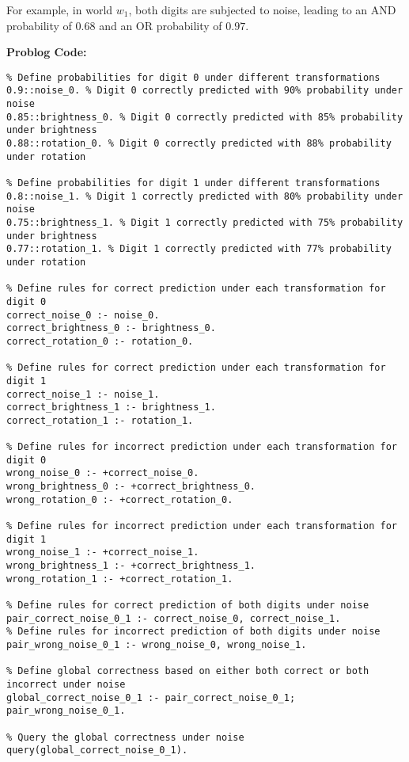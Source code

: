 For example, in world $w_1$, both digits are subjected to noise, leading to an AND probability of $0.68$ and an OR probability of $0.97$.

\textbf{Problog Code:}
\begin{mdframed}[leftline=false, rightline=false, topline=true, bottomline=true]
\scriptsize
\begin{verbatim}
% Define probabilities for digit 0 under different transformations
0.9::noise_0. % Digit 0 correctly predicted with 90% probability under noise
0.85::brightness_0. % Digit 0 correctly predicted with 85% probability under brightness
0.88::rotation_0. % Digit 0 correctly predicted with 88% probability under rotation

% Define probabilities for digit 1 under different transformations
0.8::noise_1. % Digit 1 correctly predicted with 80% probability under noise
0.75::brightness_1. % Digit 1 correctly predicted with 75% probability under brightness
0.77::rotation_1. % Digit 1 correctly predicted with 77% probability under rotation

% Define rules for correct prediction under each transformation for digit 0
correct_noise_0 :- noise_0.
correct_brightness_0 :- brightness_0.
correct_rotation_0 :- rotation_0.

% Define rules for correct prediction under each transformation for digit 1
correct_noise_1 :- noise_1.
correct_brightness_1 :- brightness_1.
correct_rotation_1 :- rotation_1.

% Define rules for incorrect prediction under each transformation for digit 0
wrong_noise_0 :- +correct_noise_0.
wrong_brightness_0 :- +correct_brightness_0.
wrong_rotation_0 :- +correct_rotation_0.

% Define rules for incorrect prediction under each transformation for digit 1
wrong_noise_1 :- +correct_noise_1.
wrong_brightness_1 :- +correct_brightness_1.
wrong_rotation_1 :- +correct_rotation_1.

% Define rules for correct prediction of both digits under noise
pair_correct_noise_0_1 :- correct_noise_0, correct_noise_1.
% Define rules for incorrect prediction of both digits under noise
pair_wrong_noise_0_1 :- wrong_noise_0, wrong_noise_1.

% Define global correctness based on either both correct or both incorrect under noise
global_correct_noise_0_1 :- pair_correct_noise_0_1; pair_wrong_noise_0_1.

% Query the global correctness under noise
query(global_correct_noise_0_1).
\end{verbatim}
\end{mdframed}

